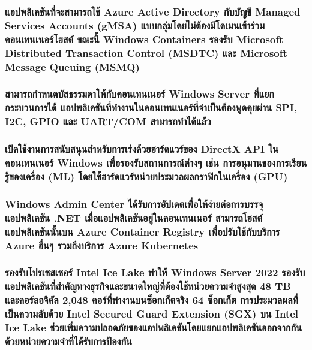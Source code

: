 \hspace{1cm}\subsubsection{แอปพลิเคชันที่จะสามารถใช้ Azure Active Directory กับบัญชี Managed Services Accounts (gMSA) แบบกลุ่มโดยไม่ต้องมีโดเมนเข้าร่วมคอนเทนเนอร์โฮสต์ ขณะนี้ Windows Containers รองรับ Microsoft Distributed Transaction Control (MSDTC) และ Microsoft Message Queuing (MSMQ)}

\hspace{1cm}\subsubsection{สามารถกำหนดบัสธรรมดาให้กับคอนเทนเนอร์ Windows Server ที่แยกกระบวนการได้ แอปพลิเคชันที่ทำงานในคอนเทนเนอร์ที่จำเป็นต้องพูดคุยผ่าน SPI, I2C, GPIO และ UART/COM สามารถทำได้แล้ว }

\hspace{1cm}\subsubsection{เปิดใช้งานการสนับสนุนสำหรับการเร่งด้วยฮาร์ดแวร์ของ DirectX API ในคอนเทนเนอร์ Windows เพื่อรองรับสถานการณ์ต่างๆ เช่น การอนุมานของการเรียนรู้ของเครื่อง (ML) โดยใช้ฮาร์ดแวร์หน่วยประมวลผลกราฟิกในเครื่อง (GPU) }

\hspace{1cm}\subsubsection{Windows Admin Center ได้รับการอัปเดตเพื่อให้ง่ายต่อการบรรจุแอปพลิเคชัน .NET เมื่อแอปพลิเคชันอยู่ในคอนเทนเนอร์ สามารถโฮสต์แอปพลิเคชันนั้นบน Azure Container Registry เพื่อปรับใช้กับบริการ Azure อื่นๆ รวมถึงบริการ Azure Kubernetes }

\hspace{1cm}\subsubsection{รองรับโปรเซสเซอร์ Intel Ice Lake ทำให้ Windows Server 2022 รองรับแอปพลิเคชันที่สำคัญทางธุรกิจและขนาดใหญ่ที่ต้องใช้หน่วยความจำสูงสุด 48 TB และคอร์ลอจิคัล 2,048 คอร์ที่ทำงานบนซ็อกเก็ตจริง 64 ซ็อกเก็ต การประมวลผลที่เป็นความลับด้วย Intel Secured Guard Extension (SGX) บน Intel Ice Lake ช่วยเพิ่มความปลอดภัยของแอปพลิเคชันโดยแยกแอปพลิเคชันออกจากกันด้วยหน่วยความจำที่ได้รับการป้องกัน }

\clearpage



